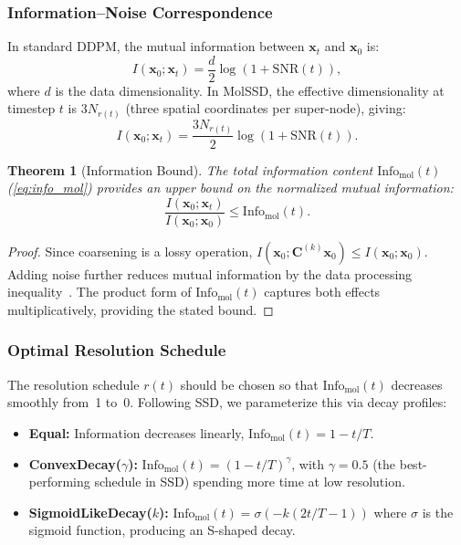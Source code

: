 \documentclass[12pt,a4paper]{article}
\newtheorem{theorem}{Theorem}[section]
\newcommand{\SNR}{\mathrm{SNR}}
\newcommand{\Info}{\mathrm{Info}}
\newcommand{\bx}{\bm{x}}
\begin{document}
\subsubsection{Information--Noise Correspondence}

In standard DDPM, the mutual information between $\bx_t$ and $\bx_0$ is:
\begin{equation}\label{eq:mutual_info_ddpm}
    I(\bx_0; \bx_t) = \frac{d}{2} \log\left(1 + \SNR(t)\right),
\end{equation}
where $d$ is the data dimensionality. In MolSSD, the effective dimensionality at timestep $t$ is $3 N_{r(t)}$ (three spatial coordinates per super-node), giving:
\begin{equation}\label{eq:mutual_info_molssd}
    I(\bx_0; \bx_t) = \frac{3 N_{r(t)}}{2} \log\left(1 + \SNR(t)\right).
\end{equation}

\begin{theorem}[Information Bound]\label{thm:info_bound}
The total information content $\Info_{\mathrm{mol}}(t)$ (\cref{eq:info_mol}) provides an upper bound on the normalized mutual information:
\begin{equation}\label{eq:info_bound}
    \frac{I(\bx_0; \bx_t)}{I(\bx_0; \bx_0)} \leq \Info_{\mathrm{mol}}(t).
\end{equation}
\end{theorem}
\begin{proof}
Since coarsening is a lossy operation, $I(\bx_0; \bm{C}^{(k)} \bx_0) \leq I(\bx_0; \bx_0)$. Adding noise further reduces mutual information by the data processing inequality~\cite{cover2006information}. The product form of $\Info_{\mathrm{mol}}(t)$ captures both effects multiplicatively, providing the stated bound.
\end{proof}

\subsubsection{Optimal Resolution Schedule}

The resolution schedule $r(t)$ should be chosen so that $\Info_{\mathrm{mol}}(t)$ decreases smoothly from~1 to~0. Following SSD, we parameterize this via decay profiles:
\begin{itemize}
    \item \textbf{Equal:} Information decreases linearly, $\Info_{\mathrm{mol}}(t) = 1 - t/T$.
    \item \textbf{ConvexDecay($\gamma$):} $\Info_{\mathrm{mol}}(t) = (1 - t/T)^\gamma$, with $\gamma = 0.5$ (the best-performing schedule in SSD) spending more time at low resolution.
    \item \textbf{SigmoidLikeDecay($k$):} $\Info_{\mathrm{mol}}(t) = \sigma(-k(2t/T - 1))$ where $\sigma$ is the sigmoid function, producing an S-shaped decay.
\end{itemize}
\end{document}
